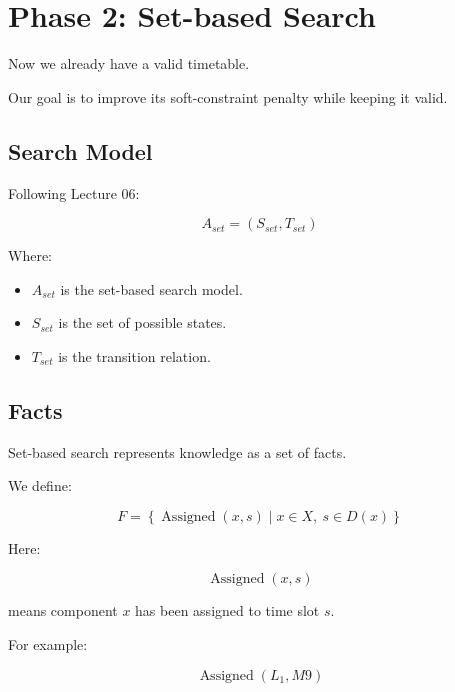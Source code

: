 \documentclass[11pt,letterpaper]{article}
\newcommand{\Assign}{\operatorname{Assigned}}
\begin{document}
\section{Phase 2: Set-based Search}

Now we already have a valid timetable.

Our goal is to improve its soft-constraint
penalty while keeping it valid.

\subsection{Search Model}

Following Lecture 06:

\begin{equation}
\boxed{
A_{set}=(S_{set},T_{set})
}
\end{equation}

Where:

\begin{itemize}
    \item $A_{set}$ is the set-based search model.
    \item $S_{set}$ is the set of possible states.
    \item $T_{set}$ is the transition relation.
\end{itemize}

\subsection{Facts}

Set-based search represents knowledge
as a set of facts.

We define:

\begin{equation}
\boxed{
F=
\left\{
\Assign(x,s)
\mid
x\in X,\ s\in D(x)
\right\}
}
\end{equation}

Here:

\begin{equation}
\Assign(x,s)
\end{equation}

means component $x$ has been assigned
to time slot $s$.

For example:

\begin{equation}
\Assign(L_1,M9)
\end{equation}
\end{document}
